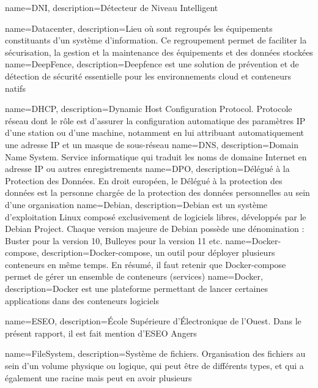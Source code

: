 {
    name=DNI,
    description={Détecteur de Niveau Intelligent}
}

{
    name=Datacenter,
    description={Lieu où sont regroupés les équipements constituants d'un système d'information. Ce regroupement permet de faciliter la sécurisation, la gestion et la maintenance des équipements et des données stockées}
}
{
    name=DeepFence,
    description={Deepfence est une solution de prévention et de détection de sécurité essentielle pour les environnements cloud et conteneurs natifs}
}

{
    name=DHCP,
    description={Dynamic Host Configuration Protocol. Protocole réseau dont le rôle est d’assurer la configuration automatique des paramètres IP d’une station ou d'une machine, notamment en lui attribuant automatiquement une adresse IP et un masque de sous-réseau}
}
{
    name=DNS,
    description={Domain Name System. Service informatique qui traduit les noms de domaine Internet en adresse IP ou autres enregistrements}
}
{
    name=DPO,
    description={Délégué à la Protection des Données. En droit européen, le Délégué à la protection des données est la personne chargée de la protection des données personnelles au sein d'une organisation}
}
{
    name=Debian,
    description={Debian est un système d’exploitation Linux composé exclusivement de logiciels libres, développés par le Debian Project. Chaque version majeure de Debian possède une dénomination : Buster pour la version 10, Bulleyes pour la version 11 etc.}
}
{
    name=Docker-compose,
    description={Docker-compose, un outil pour déployer plusieurs conteneurs en même temps. En résumé, il faut retenir que Docker-compose permet de gérer un ensemble de conteneurs (services)}
}
{
    name=Docker,
    description={Docker est une plateforme permettant de lancer certaines applications dans des conteneurs logiciels}
}

{
    name=ESEO,
    description={École Supérieure d'Électronique de l'Ouest. Dans le présent rapport, il est fait mention d'ESEO Angers}
}

{
    name=FileSystem,
    description={Système de fichiers. Organisation des fichiers au sein d'un volume physique ou logique, qui peut être de différents types, et qui a également une racine mais peut en avoir plusieurs}
}


